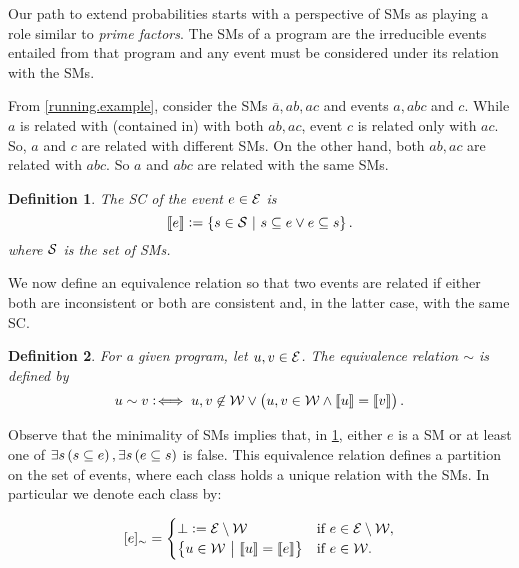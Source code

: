 \documentclass[adraft,copyright,creativecommons]{eptcs}
\newtheorem{definition}{Definition}
\newcommand{\co}[1]{\ensuremath{\overline{#1}}}
\newcommand{\fml}[1]{\ensuremath{{\cal #1}}}
\newcommand{\stablecore}[1]{\ensuremath{\left\llbracket #1 \right\rrbracket}}
\newcommand{\class}[1]{\ensuremath{[{#1}]_{\sim}}}
\newcommand{\inconsistent}{\bot}
\newcommand{\given}{\ensuremath{~\middle|~}}
\begin{document}
Our path to extend probabilities starts with a perspective of \aclp{SM} as playing a role similar to \emph{prime factors}.  The \aclp{SM} of a program are the irreducible events entailed from that program and any event must be considered under its relation with the \aclp{SM}.

From  \cref{running.example}, consider the \acp{SM} $\co{a}, ab, ac$ and events $a, abc$ and $c$. While $a$ is related with (contained in) with both $ab, ac$, event $c$ is related only with $ac$. So, $a$ and $c$ are related with different \acp{SM}. On the other hand, both $ab, ac$ are related with $abc$. So $a$ and $abc$ are related with the same \aclp{SM}.

\begin{definition}\label{def:stable.core}
    The \emph{\ac{SC}} of the event $e\in \fml{E}$ is
    \begin{equation}
        \stablecore{e} := \set{s \in \fml{S} \given s \subseteq e \vee e \subseteq s}. \label{eq:stable.core}
    \end{equation}
    where $\fml{S}$ is the set of \aclp{SM}.
\end{definition}

We now define an equivalence relation so that two events are related if either both are inconsistent or both are consistent and, in the latter case, with the same \acl{SC}.

\begin{definition}\label{def:equiv.rel}
    For a given program, let $u, v \in \fml{E}$. The equivalence relation $\sim$ is defined by
    \begin{equation}
        u \sim v :\!\iff u,v \not\in\fml{W} \vee \del{u,v \in \fml{W} \wedge \stablecore{u} = \stablecore{v}}.\label{eq:equiv.rel}
    \end{equation}
\end{definition}

Observe that the minimality of \aclp{SM} implies that, in \cref{def:stable.core}, either $e$ is a \acl{SM} or at least one of $\exists s \del{s \subseteq e}, \exists s \del{e \subseteq s}$ is false. This equivalence relation defines a partition on the set of events, where each class holds a unique relation with the \aclp{SM}. In particular we denote each class by:

\begin{equation}
    \class{e} =
    \begin{cases}
        \inconsistent := \fml{E} \setminus \fml{W}
         & \text{if~} e \in \fml{E} \setminus \fml{W}, \\
        \set{u \in \fml{W} \given \stablecore{u} = \stablecore{e}}
         & \text{if~} e \in \fml{W}.
    \end{cases}\label{eq:event.class}
\end{equation}
\end{document}
